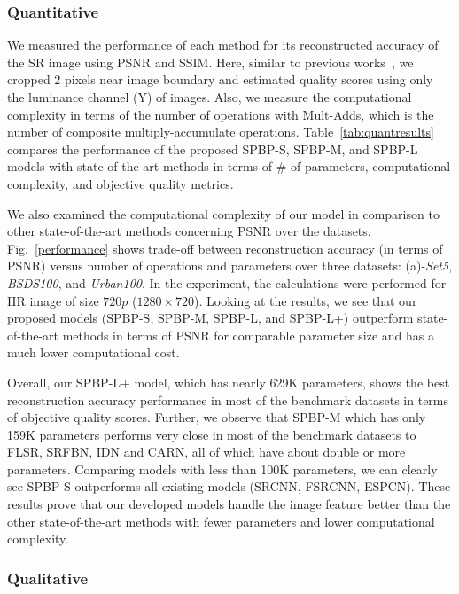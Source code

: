 \documentclass[a4paper,11pt]{article}
\begin{document}
\subsubsection{Quantitative}


We measured the performance of each method for its reconstructed accuracy of the SR image using PSNR and SSIM. Here, similar to previous works~\cite{EDSR, VDSR}, we cropped $2$ pixels near image boundary and estimated quality scores using only the luminance channel (Y) of images. Also, we measure the computational complexity in terms of the number of operations with Mult-Adds, which is the number of composite multiply-accumulate operations. Table~\ref{tab:quantresults} compares the performance of the proposed SPBP-S, SPBP-M, and SPBP-L models with state-of-the-art methods in terms of $\#$ of parameters, computational complexity, and objective quality metrics.

We also examined the computational complexity of our model in comparison to other state-of-the-art methods concerning PSNR over the datasets. Fig.~\ref{performance} shows trade-off between reconstruction accuracy (in terms of PSNR) versus number of operations and parameters over three datasets: (a)-\textit{Set5}, \textit{BSDS100}, and \textit{Urban100}. In the experiment, the calculations were performed for HR image of size $720p$ ($1280\times720$). Looking at the results, we see that our proposed models (SPBP-S, SPBP-M, SPBP-L, and SPBP-L+) outperform state-of-the-art methods in terms of PSNR for comparable parameter size and has a much lower computational cost.

Overall, our SPBP-L+ model, which has nearly 629K parameters, shows the best reconstruction accuracy performance in most of the benchmark datasets in terms of objective quality scores. Further, we observe that SPBP-M which has only 159K parameters performs very close in most of the benchmark datasets to FLSR, SRFBN, IDN and CARN, all of which have about double or more parameters. Comparing models with less than 100K parameters, we can clearly see SPBP-S outperforms all existing models (SRCNN, FSRCNN, ESPCN). These results prove that our developed models handle the image feature better than the other state-of-the-art methods with fewer parameters and lower computational complexity.\\

\subsubsection{Qualitative}
\end{document}
